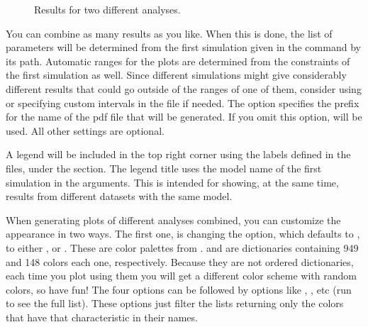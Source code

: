 \documentclass[letterpaper,12pt,english]{sphinxhowto}
\begin{document}
\begin{figure}[!tb]
\centering
\capstart

\noindent{}
\caption{Results for two different analyses.}\label{\detokenize{MCMC:id10}}\end{figure}

You can combine as many results as you like.
When this is done, the list of parameters will be determined from the first
simulation given in the command by its path.
Automatic ranges for the plots are determined from the constraints of the first
simulation as well.
Since different simulations might give considerably different results
that could go outside of the ranges of one of them, consider using
 or specifying custom intervals in the  file if
needed.
The  option specifies the prefix for the name of the pdf file
that will be generated.
If you omit this option,  will be used.
All other settings are optional.

A legend will be included in the top right corner using the labels defined in
the  files, under the  section.
The legend title uses the model name of the first simulation in the arguments.
This is intended for showing, at the same time, results from different datasets
with the same model.

When generating plots of different analyses combined, you can customize the
appearance in two ways.
The first one, is changing the  option, which defaults to
, to either ,  or .
These are color palettes from .
 and  are dictionaries containing 949 and 148
colors each one, respectively.
Because they are not ordered dictionaries, each time you
plot using them you will get a different color scheme with random
colors, so have fun!
The four options can be followed by options like , , etc
(run  to see the full list).
These options just filter the lists returning only the colors that have that
characteristic in their names.
\end{document}
